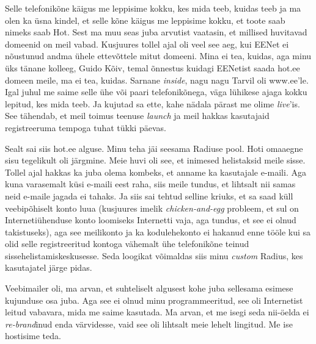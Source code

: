 Selle telefonikõne käigus me leppisime kokku, kes mida teeb, kuidas teeb ja ma 
olen ka üsna kindel, et selle kõne käigus me leppisime kokku, et toote saab 
nimeks saab Hot. Sest ma muu seas juba arvutist vaatasin, et 
millised huvitavad domeenid on meil vabad. Kusjuures tollel ajal oli veel see 
aeg, kui EENet  ei nõustunud andma ühele ettevõttele mitut 
domeeni. Mina ei tea, kuidas, aga minu üks tänane kolleeg, Guido 
Kõiv, temal õnnestus kuidagi EENetist saada 
hot.ee domeen meile, ma ei tea, kuidas. Sarnane \emph{inside}, nagu nagu 
Tarvil oli www.ee'le. Igal juhul me saime selle ühe 
või paari telefonikõnega, väga lühikese ajaga kokku lepitud, kes mida teeb. Ja 
kujutad sa ette, kahe nädala pärast me olime \emph{live}'is. See tähendab, et 
meil toimus teenuse \emph{launch} ja meil hakkas kasutajaid registreeruma 
tempoga tuhat tükki päevas.

Sealt sai siis hot.ee alguse. Minu teha jäi  seesama Radiuse pool. 
Hoti omaaegne sisu tegelikult oli järgmine. Meie huvi oli see, et 
inimesed helistaksid meile sisse.  Tollel ajal hakkas ka juba olema kombeks, et 
anname ka kasutajale e-maili. Aga kuna varasemalt küsi e-maili eest raha, siis 
meile tundus, et lihtsalt nii samas neid e-maile jagada ei tahaks. Ja siis sai 
tehtud  selline kriuks, et sa saad küll veebipõhiselt konto luua (kusjuures 
imelik \emph{chicken-and-egg} probleem, et sul on Internetiühenduse konto 
loomiseks Internetti vaja, aga tundus, et see ei olnud takistuseks), aga see  
meilikonto ja ka kodulehekonto ei hakanud enne tööle kui sa olid selle 
registreeritud kontoga vähemalt ühe telefonikõne teinud 
sissehelistamiskeskusesse. Seda loogikat võimaldas siis minu \emph{custom} 
Radius, kes kasutajatel järge pidas. 


Veebimailer oli, ma arvan, et suhteliselt algusest kohe juba sellesama esimese 
kujunduse osa juba. Aga see ei olnud minu programmeeritud, see oli Internetist 
leitud vabavara, mida me saime kasutada. Ma arvan, et me isegi seda nii-öelda 
ei \emph{re-brand}inud enda värvidesse, vaid see oli lihtsalt meie lehelt 
lingitud. Me ise hostisime teda.


